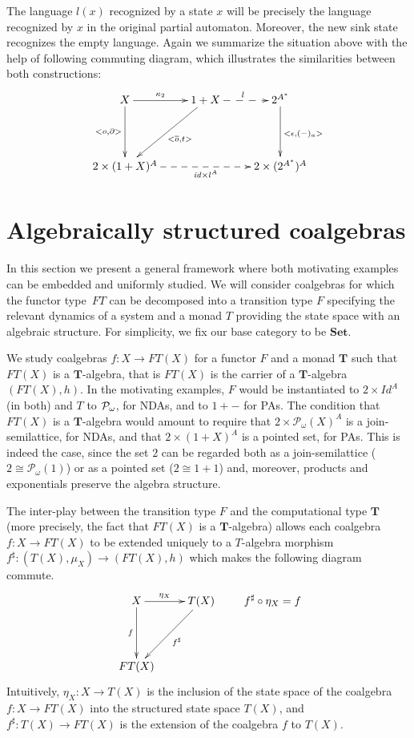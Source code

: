\documentclass{LMCS}
\def\pow#1{{\mathcal P_\omega}#1}
\def\T{\mathbf{T}}
\def\Set{\mathbf{Set}}
\begin{document}
The language $l(x)$ recognized by a state $x$ will be precisely the
language recognized by $x$ in the original partial automaton.
Moreover, the new sink state recognizes the empty language. Again we
summarize the situation above with the help of following commuting
diagram, which illustrates the similarities between both
constructions:
\[
\xymatrix@R=1.5cm{ X \ar[d]_-{<o,\partial>}\ar@{->}[r]^-{\kappa_2}&
1+X\ar[dl]^-{<\overline o,{t}>}\ar@{-->}^{l}[r] & 2^{A^*}\ar[d]^{<\epsilon, (-)_a>}\\
2\times (1+X)^A\ar@{-->}[rr]_-{\mathit{id} \times l^A}  && 2\times (2^{A^*})^A }
\]
\section{Algebraically structured coalgebras}\label{sec:general}

In this section we present a general framework where both motivating
examples can be embedded and uniformly studied. We will consider
coalgebras for which the functor type~$FT$ can be decomposed into a
transition type $F$ specifying the relevant dynamics of a system and
a monad $T$ providing the state space with an algebraic structure.
For simplicity, we fix our base category to be $\Set$.



We study coalgebras $f\colon X \to FT(X)$ for a functor $F$ and a
monad $\T$ such that $FT(X)$ is a $\T$-algebra, that is $FT(X)$ is the carrier of a $\T$-algebra
$(FT(X),h)$. In the motivating examples, $F$ would be instantiated to
$2\times Id^A$ (in both) and $T$ to $\pow$, for NDAs, and to $1+-$ for
PAs. The condition that $FT(X)$ is a $\T$-algebra would amount to
require that $2\times \pow (X)^A$ is a join-semilattice, for NDAs, and
that $2\times (1+X)^A$ is a pointed set, for PAs. This is indeed the
case, since the set $2$ can be regarded both as a join-semilattice
($2\cong \pow(1)$) or as a pointed set ($2\cong 1+1$) and, moreover,
products and exponentials preserve the algebra structure.

The inter-play between the transition type $F$ and the
computational type $\T$ (more precisely, the fact that $FT(X)$ is a $\T$-algebra) allows each coalgebra $f\colon X
\rightarrow FT(X)$ to be extended uniquely to a $T$-algebra
morphism $ f^\sharp\colon(T(X),\mu_X) \rightarrow (FT(X),h)$ which
makes the following diagram commute.
\[
\xymatrix@R=1.5cm{
X \ar[d]_-{f}\ar[r]^-{\eta_X} & T(X)\ar[dl]^-{f^\sharp}\\
FT(X) &
}\ \ \ \ \ \ \  f^\sharp \circ \eta_X = f
\]
Intuitively, $\eta_X\colon X \rightarrow T(X)$ is the
inclusion of the state space of the coalgebra $f\colon X \rightarrow
FT(X)$ into the structured state space $T(X)$, and $f^\sharp\colon T(X)
\rightarrow FT(X)$ is the extension of the coalgebra $f$ to $T(X)$.
\end{document}
